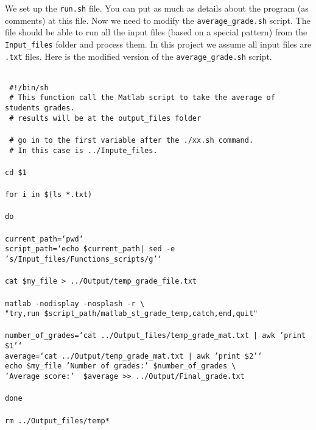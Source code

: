 \noindent
We set up the \texttt{run.sh} file. You can put as much as details about the program (as comments) at this file. Now we need to modify the \texttt{average\_grade.sh} script. The file should be able to run all the input files (based on a special pattern) from the \texttt{Input\_files} folder and process them. In this project we assume all input files are \texttt{.txt} files. Here is the modified version of the \texttt{average\_grade.sh} script.





 
\begin{mdframed}[hidealllines=true,backgroundcolor=gray!20]
\begin{singlespace}
\fontsize{10pt}{1pt}
\texttt{
\\
{ \color{matlab_green} \#!/bin/sh}\\
{ \color{matlab_green} \# This function call the Matlab script to take the average of students grades.}\\
{ \color{matlab_green} \# results will be at the output\_files folder}\\
\\
{ \color{matlab_green} \# go in to the first variable after the ./xx.sh command.}\\
{ \color{matlab_green} \# In this case is ../Inpute\_files.}\\
\\
cd \$1\\
\\
{\color{for_pink}for} i {\color{for_pink}in} \$(ls *.txt)\\
\\
{\color{for_pink}do}\\
\\
current\_path={\color{red}`pwd`}\\
script\_path={\color{red}`echo \$current\_path| sed -e 's/Input\_files/Functions\_scripts/g'`}\\
\\
cat \$my\_file > ../Output/temp\_grade\_file.txt\\
\\
matlab -nodisplay -nosplash -r   \textbackslash \\
{\color{red}"try,run \$script\_path/matlab\_st\_grade\_temp,catch,end,quit"}\\
\\
number\_of\_grades={\color{red}`cat ../Output\_files/temp\_grade\_mat.txt | awk '{print \$1}'`}\\
average={\color{red}`cat ../Output/temp\_grade\_mat.txt | awk '{print \$2}'`}\\
echo \$my\_file {\color{red}'Number of grades:'}  \$number\_of\_grades \textbackslash \\
\phantom{x}\hspace{14ex} {\color{red}'Average score:'} \  \$average >> ../Output/Final\_grade.txt \\
\\
{\color{for_pink}done}\\
\\
rm ../Output\_files/temp*  \\  
 }
\end{singlespace}
\end{mdframed}
